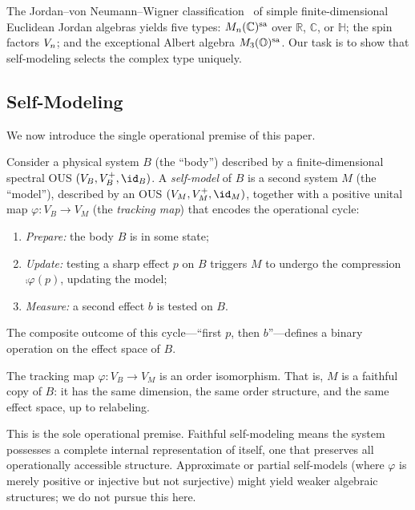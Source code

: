 \documentclass[11pt]{article}
\begin{document}
The Jordan--von Neumann--Wigner
classification~\cite{JordanVonNeumannWigner1934} of simple
finite-dimensional Euclidean Jordan algebras yields five types:
$M_{n}(\mathbb{C})^{\mathrm{sa}}$ over $\mathbb{R}$, $\mathbb{C}$, or $\mathbb{H}$; the
spin factors $V_{n}$; and the exceptional Albert algebra
$M_{3}(\mathbb{O})^{\mathrm{sa}}$.  Our task is to show that self-modeling
selects the complex type uniquely.


\subsection{Self-Modeling}
\label{sec:self-modeling}

We now introduce the single operational premise of this paper.

Consider a physical system $B$ (the ``body'') described by a
finite-dimensional spectral OUS $(V_{B}, V_{B}^{+}, \id_{B})$.  A
\emph{self-model} of $B$ is a second system $M$ (the ``model''),
described by an OUS $(V_{M}, V_{M}^{+}, \id_{M})$, together with a
positive unital map $\varphi: V_{B} \to V_{M}$ (the \emph{tracking
map}) that encodes the operational cycle:
\begin{enumerate}[label=(\roman*)]
  \item \emph{Prepare:} the body $B$ is in some state;
  \item \emph{Update:} testing a sharp effect $p$ on $B$ triggers
    $M$ to undergo the compression $\comp{\varphi(p)}$, updating
    the model;
  \item \emph{Measure:} a second effect $b$ is tested on $B$.
\end{enumerate}
The composite outcome of this cycle---``first $p$, then $b$''---defines
a binary operation on the effect space of $B$.

\begin{assumption}\label{ass:faithful}
  The tracking map $\varphi: V_{B} \to V_{M}$ is an order
  isomorphism.  That is, $M$ is a faithful copy of $B$: it has the
  same dimension, the same order structure, and the same effect space,
  up to relabeling.
\end{assumption}

This is the sole operational premise.  Faithful self-modeling means
the system possesses a complete internal representation of itself, one
that preserves all operationally accessible structure.  Approximate or
partial self-models (where $\varphi$ is merely positive or injective
but not surjective) might yield weaker algebraic structures; we do not
pursue this here.
\end{document}
